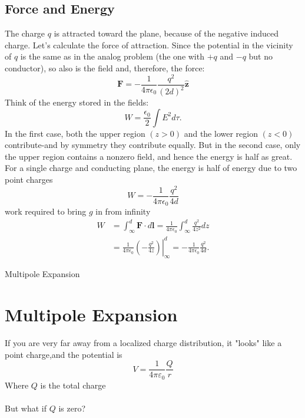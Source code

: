 \subsection{Force and Energy}
The charge $q$ is attracted toward the plane, because of the negative induced charge. Let's calculate the force of attraction. Since the potential in the vicinity of $q$ is the same as in the analog problem (the one with $+q$ and $-q$ but no conductor), so also is the field and, therefore, the force:
$$
\mathbf{F}=-\frac{1}{4 \pi \epsilon_{0}} \frac{q^{2}}{(2 d)^{2}} \hat{\mathbf{z}} 
$$
Think of the energy stored in the fields:
$$
W=\frac{\epsilon_{0}}{2} \int E^{2} d \tau .
$$
In the first case, both the upper region $(z>0)$ and the lower region $(z<0)$ contribute-and by symmetry they contribute equally. But in the second case, only the upper region contains a nonzero field, and hence the energy is half as great.\\
For a single charge and conducting plane, the energy is half of energy due to two point charges
$$W=-\frac{1}{4 \pi \epsilon_{0}} \frac{q^{2}}{4 d}$$
work required to bring $g$ in from infinity
\begin{align*}
 W &=\int_{\infty}^{d} \mathbf{F} \cdot d \mathbf{l}=\frac{1}{4 \pi \epsilon_{0}} \int_{\infty}^{d} \frac{q^{2}}{4 z^{2}} d z \\
&=\left.\frac{1}{4 \pi \epsilon_{0}}\left(-\frac{q^{2}}{4 z}\right)\right|_{\infty} ^{d}=-\frac{1}{4 \pi \epsilon_{0}} \frac{q^{2}}{4 d} .
\end{align*}
\newpage 
\begin{abox}
	Multipole Expansion
\end{abox}
\section{Multipole Expansion}
If you are very far away from a localized charge distribution, it "looks" like a point charge,and the potential is
$$V=\frac{1}{4\pi \varepsilon_{0}}\frac{Q}{r}$$
Where $Q$ is the total charge\\\\
But what if $Q$ is zero?
